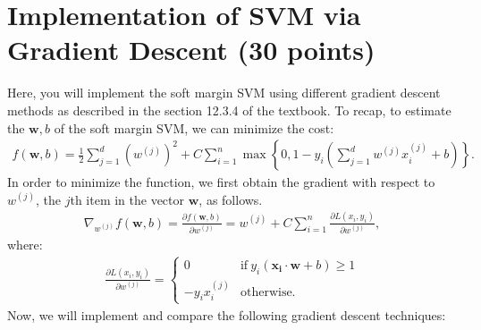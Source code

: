 \section{Implementation of SVM via Gradient Descent (30 points) }
Here, you will implement the soft margin SVM using different gradient descent methods as described in the section 12.3.4 of the textbook. To recap, to estimate the $\mathbf{w}, b$ of the soft margin SVM, we can minimize the cost:
\begin{align}
f(\mathbf{w},b) = \frac{1}{2} \sum_{j=1}^d (w^{(j)})^2 + C \sum_{i=1}^n \max\left\{0, 1 - y_i\left(\sum_{j=1}^d w^{(j)}x_i^{(j)} + b \right)\right\}.
\end{align}
In order to minimize the function, we first obtain the gradient with respect to $w^{(j)}$, the $j$th item in the vector $\mathbf{w}$, as follows.
\begin{align}
\nabla_{w^{(j)}} f(\mathbf{w},b)  = \frac{\partial f(\mathbf{w},b)}{\partial w^{(j)}} = w^{(j)} + C \sum_{i = 1}^n \frac{\partial L(x_i, y_i)}{\partial w^{(j)}},
\end{align}
where:
\begin{align*}
 \frac{\partial L(x_i, y_i)}{\partial w^{(j)}} =     
 \left\{\begin{array}{cl}
      0 & \text{if}\  y_i\left(\mathbf{x_i} \cdot \mathbf{w}  + b \right) \ge 1 \\
      -y_ix_i^{(j)} & \text{otherwise.}
    \end{array}\right.
\end{align*}
Now, we will implement and compare the following gradient descent techniques:
